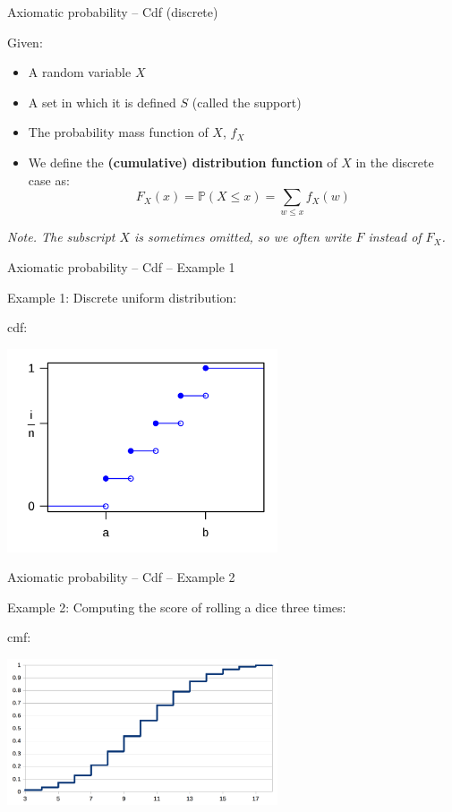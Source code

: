 \documentclass{beamer}
\begin{document}
\begin{frame}
{\centerline{Axiomatic probability -- Cdf (discrete)}}
Given:
\begin{itemize}
\item A random variable $X$
\item A set in which it is defined $S$ (called the support)
\item The probability mass function of $X$, $f_X$
\item We define the \textbf{(cumulative) distribution function} of $X$ in the discrete case as:
$$F_X(x) = \mathbb{P}(X \leq x) =  \sum_{w\leq x} f_X(w)$$
\end{itemize}

\vspace*{1cm}
\textit{Note. The subscript $X$ is sometimes omitted, so we often write $F$ instead of $F_X$.}

\end{frame}


\begin{frame}
{\centerline{Axiomatic probability -- Cdf -- Example 1}}
Example 1: Discrete uniform distribution:


cdf:
\begin{center}
\includegraphics[width=8cm]{A2022.FondamentiStatistica/1200px-Dis_Uniform_distribution_CDF_svg.png}
\end{center}

\end{frame}

\begin{frame}
{\centerline{Axiomatic probability -- Cdf -- Example 2}}
Example 2: Computing the score of rolling a dice three times:

cmf:
\begin{center}
\includegraphics[width=8cm]{A2022.FondamentiStatistica/RollingADiceThreeTimes_cdf.png}
\end{center} 

\end{frame}
\end{document}
